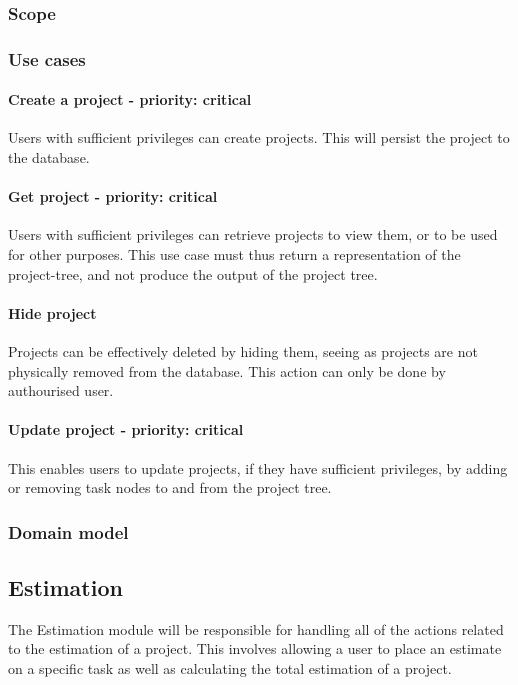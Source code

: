 \subsubsection{Scope}

\subsubsection{Use cases}

\paragraph{Create a project - priority: critical}
Users with sufficient privileges can create projects. This will persist the project to the database.

\paragraph{Get project - priority: critical}
Users with sufficient privileges can retrieve projects to view them, or to be used for other purposes. This use case must thus return a representation of the project-tree, and not produce the output of the project tree.

\paragraph{Hide project}
Projects can be effectively deleted by hiding them, seeing as projects are not physically removed from the database. This action can only be done by authourised user.

\paragraph{Update project - priority: critical}
This enables users to update projects, if they have sufficient privileges, by adding or removing task nodes to and from the project tree.

\subsubsection{Domain model}

\subsection{Estimation}
	The Estimation module will be responsible for handling all of the actions related to the estimation of a project. This involves allowing a user to place an estimate on a specific task as well as calculating the total estimation of a project.

